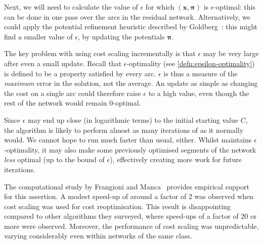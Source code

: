 Next, we will need to calculate the value of $\epsilon$ for which $\left(\mathbf{x},\boldsymbol{\pi}\right)$ is $\epsilon$-optimal: this can be done in one pass over the arcs in the residual network\footnotemark. Alternatively, we could apply the potential refinement heuristic described by Goldberg~\cite[\S3.2]{Goldberg:1997}: this might find a smaller value of $\epsilon$, by updating the potentials $\boldsymbol{\pi}$.

The key problem with using cost scaling incrementally is that $\epsilon$ may be very large after even a small update. Recall that $\epsilon$-optimality (see \cref{defn:epsilon-optimality}) is defined to be a property satisfied by every arc. $\epsilon$ is thus a measure of the \emph{maximum} error in the solution, not the average. An update as simple as changing the cost on a single arc could therefore raise $\epsilon$ to a high value, even though the rest of the network would remain $0$-optimal\footnotemark.

Since $\epsilon$ may end up close (in logarithmic terms) to the initial starting value $C$, the algorithm is likely to perform almost as many iterations of  as it normally would. We cannot hope  to run much faster than usual, either. Whilst  maintains $\epsilon$-optimality, it may also make some previously optimised segments of the network \emph{less} optimal (up to the bound of $\epsilon$), effectively creating more work for future iterations.

The computational study by Frangioni and Manca~\cite{Frangioni:2006} provides empirical support for this assertion. A modest speed-up of around a factor of 2 was observed when cost scaling was used for cost reoptimisation. This result is disappointing compared to other algorithms they surveyed, where speed-ups of a factor of 20 or more were observed. Moreover, the performance of cost scaling was unpredictable, varying considerably even within networks of the same class.

